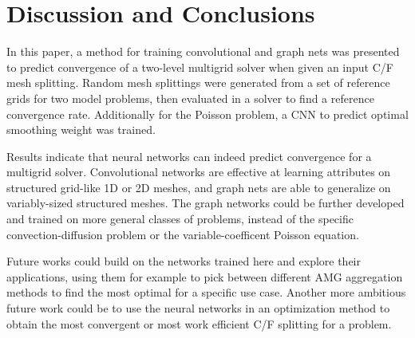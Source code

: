 \documentclass[review]{siamart190516}
\begin{document}
\section{Discussion and Conclusions}\label{sec:conc}

In this paper, a method for training convolutional and graph nets was presented to predict convergence of a two-level multigrid solver when given an input C/F mesh splitting.  Random mesh splittings were generated from a set of reference grids for two model problems, then evaluated in a solver to find a reference convergence rate.  Additionally for the Poisson problem, a CNN to predict optimal smoothing weight was trained.

Results indicate that neural networks can indeed predict convergence for a multigrid solver.  Convolutional networks are effective at learning attributes on structured grid-like 1D or 2D meshes, and graph nets are able to generalize on variably-sized structured meshes.  The graph networks could be further developed and trained on more general classes of problems, instead of the specific convection-diffusion problem or the variable-coefficent Poisson equation.

Future works could build on the networks trained here and explore their applications, using them for example to pick between different AMG aggregation methods to find the most optimal for a specific use case.  Another more ambitious future work could be to use the neural networks in an optimization method to obtain the most convergent or most work efficient C/F splitting for a problem.



\end{document}
